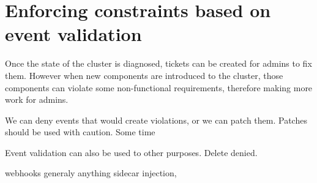 \section[Event validation based]{Enforcing constraints based on event validation}

Once the state of the cluster is diagnosed, tickets can be created for admins to fix them. However when new components are introduced to the cluster, those components can violate some non-functional requirements, therefore making more work for admins.


We can deny events that would create violations, or we can patch them. Patches should be used with caution. Some time 



Event validation can also be used to other purposes. Delete denied.

webhooks generaly anything sidecar injection, 



